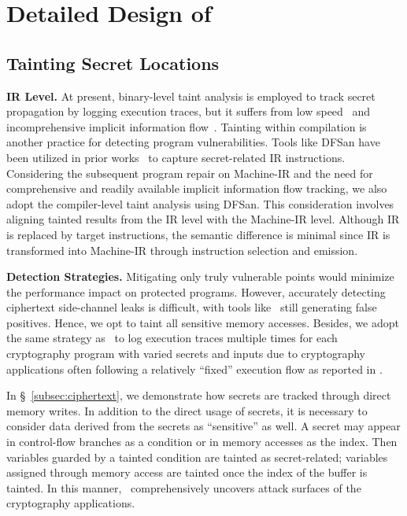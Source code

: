 \section{Detailed Design of \tool}
\label{sec:design}

\subsection{Tainting Secret Locations}
\label{subsec:tainting}

\noindent \textbf{IR Level.}
At present, binary-level taint analysis is employed to track secret propagation by logging execution traces, but it suffers from low speed~\cite{wang2017cached, jiang2022cache} and incomprehensive implicit information flow~\cite{weiser2018data}.
Tainting within compilation is another practice for detecting program vulnerabilities. 
Tools like DFSan have been utilized in prior works~\cite{borrello2021constantine, deng2023cipherh} to capture secret-related IR instructions.
Considering the subsequent program repair on Machine-IR and the need for comprehensive and readily available implicit information flow tracking, we also adopt the compiler-level taint analysis using DFSan.
This consideration involves aligning tainted results from the IR level with the Machine-IR level. 
Although IR is replaced by target instructions, the semantic difference is minimal since IR is transformed into Machine-IR through instruction selection and emission. 

\noindent \textbf{Detection Strategies.}
Mitigating only truly vulnerable points would minimize the performance impact on protected programs. 
However, accurately detecting ciphertext side-channel leaks is difficult, with tools like \htool\ still generating false positives. Hence, we opt to taint all sensitive memory accesses. 
Besides, we adopt the same strategy as \ftool\ to log execution traces multiple times for each cryptography program with varied secrets and inputs due to cryptography applications often following a relatively ``fixed'' execution flow as reported in \htool.

In \S~\ref{subsec:ciphertext}, we demonstrate how secrets are tracked through direct memory writes. 
In addition to the direct usage of secrets, it is necessary to consider data derived from the secrets as ``sensitive'' as well.
A secret may appear in control-flow branches as a condition or in memory accesses as the index. Then variables guarded by a tainted condition are tainted as secret-related; variables assigned through memory access are tainted once the index of the buffer is tainted.
In this manner, \tool\ comprehensively uncovers attack surfaces of the cryptography applications.

